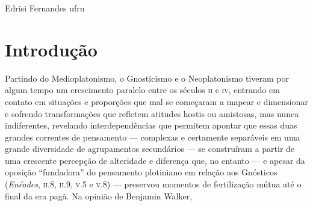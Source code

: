 %
	 {Edrisi Fernandes}%
	 {ufrn}


\section{Introdução}

Partindo do Medioplatonismo, o Gnosticismo e o Neoplatonismo
tiveram por algum tempo um crescimento paralelo entre os séculos
\textsc{ii} e \textsc{iv}, entrando em contato em situações e proporções que mal
se começaram a mapear e dimensionar e sofrendo transformações
que refletem atitudes hostis ou amistosas, mas nunca
indiferentes, revelando interdependências que permitem apontar
que essas duas grandes correntes de pensamento --- complexas e
certamente separáveis em uma grande diversidade de agrupamentos
secundários --- se construíram a partir de uma crescente percepção
de alteridade e diferença que, no entanto --- e apesar da oposição
“fundadora” do pensamento plotiniano em relação aos Gnósticos
(\emph{Enéades}, \textsc{ii}.8, \textsc{ii}.9, \textsc{v}.5 e
\textsc{v}.8) --- preservou momentos
de fertilização mútua até o final da era pagã. Na opinião de
Benjamin Walker,

